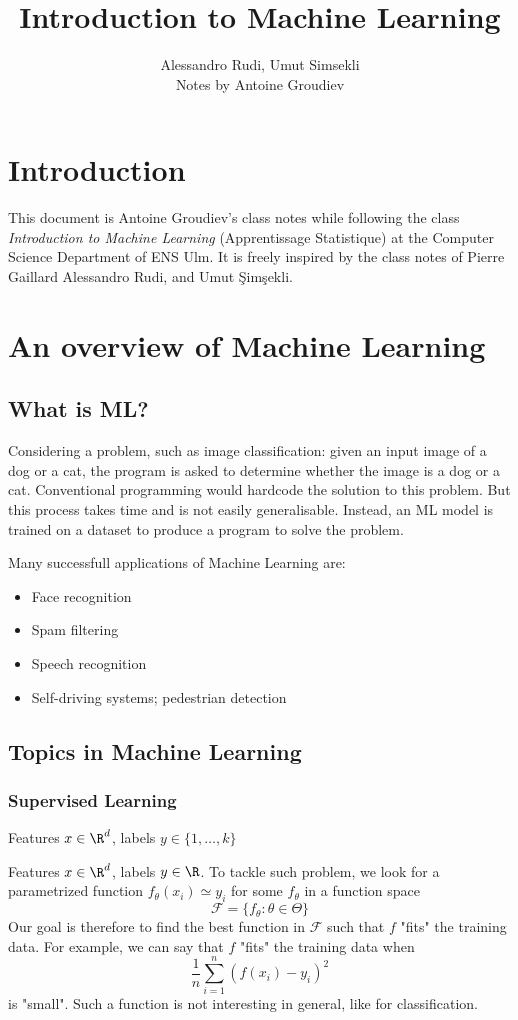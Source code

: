 \documentclass[toc]{../cs-classes/cs-classes}
\title{Introduction to Machine Learning}
\author{Alessandro Rudi, Umut Simsekli\\ Notes by Antoine Groudiev}
\begin{document}
\section*{Introduction}
This document is Antoine Groudiev's class notes while following the class \emph{Introduction to Machine Learning} (Apprentissage Statistique) at the Computer Science Department of ENS Ulm. It is freely inspired by the class notes of Pierre Gaillard Alessandro Rudi, and Umut \c{S}im\c{s}ekli. 

\section{An overview of Machine Learning}
\subsection{What is ML?}
Considering a problem, such as image classification: given an input image of a dog or a cat, the program is asked to determine whether the image is a dog or a cat. Conventional programming would hardcode the solution to this problem. But this process takes time and is not easily generalisable. Instead, an ML model is trained on a dataset to produce a program to solve the problem.

Many successfull applications of Machine Learning are:
\begin{itemize}
    \item Face recognition
    \item Spam filtering
    \item Speech recognition
    \item Self-driving systems; pedestrian detection
\end{itemize}

\subsection{Topics in Machine Learning}
\subsubsection{Supervised Learning}
\begin{example}[Classification]
    Features $x\in\R^d$, labels $y\in\{1, \dots, k\}$
\end{example}

\begin{definition}[Regression]
    Features $x\in\R^d$, labels $y\in\R$. To tackle such problem, we look for a parametrized function $f_\theta(x_i)\simeq y_i$ for some $f_\theta$ in a function space
    \begin{equation*}
        \mathcal{F} = \{f_\theta : \theta\in\Theta\}
    \end{equation*}
    Our goal is therefore to find the best function in $\mathcal{F}$ such that $f$ "fits" the training data. For example, we can say that $f$ "fits" the training data when
    \begin{equation*}
        \frac{1}{n}\sum_{i=1}^n (f(x_i)-y_i)^2
    \end{equation*}
    is "small". Such a function is not interesting in general, like for classification. 
\end{definition}
\end{document}
